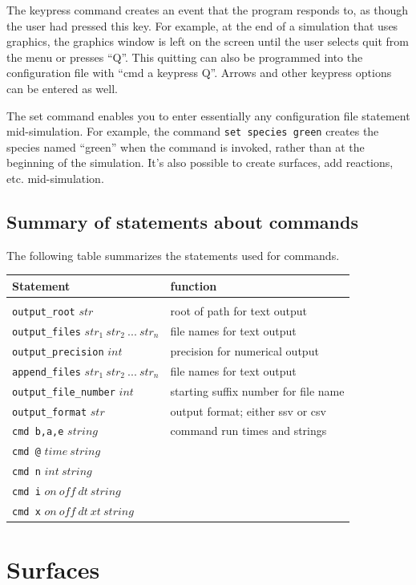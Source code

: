 \documentclass {scrbook}
\newcommand {\ttt} {\texttt}
\begin{document}
The keypress command creates an event that the program responds to, as though the user had pressed this key. For example, at the end of a simulation that uses graphics, the graphics window is left on the screen until the user selects quit from the menu or presses ``Q''. This quitting can also be programmed into the configuration file with ``cmd a keypress Q''. Arrows and other keypress options can be entered as well.

The set command enables you to enter essentially any configuration file statement mid-simulation. For example, the command \ttt{set species green} creates the species named ``green'' when the command is invoked, rather than at the beginning of the simulation. It's also possible to create surfaces, add reactions, etc. mid-simulation.

\section{Summary of statements about commands}

The following table summarizes the statements used for commands.

\begin{longtable}[c]{ll}
Statement & function\\
\hline\\
\ttt{output\_root} $str$ & root of path for text output\\
\ttt{output\_files} $str_1\ str_2\ ...\ str_n$ & file names for text output\\
\ttt{output\_precision} $int$ & precision for numerical output\\
\ttt{append\_files} $str_1\ str_2\ ...\ str_n$ & file names for text output\\
\ttt{output\_file\_number} $int$ & starting suffix number for file name\\
\ttt{output\_format} $str$ & output format; either ssv or csv\\
\ttt{cmd b,a,e} $string$ & command run times and strings\\
\ttt{cmd @} $time\ string$\\
\ttt{cmd n} $int\ string$\\
\ttt{cmd i} $on\ off\ dt\ string$\\
\ttt{cmd x} $on\ off\ dt\ xt\ string$
\end{longtable}


\chapter{Surfaces}
\end{document}
